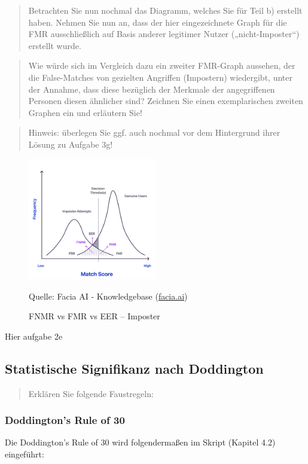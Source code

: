 \documentclass{article}
\newcommand{\annotation}[1]{
    \begin{quote}
    	\begin{textit}
			{#1}
	    \end{textit}
    \end{quote}
}
\newcommand{\figuresource}[1]{
	\begin{center}Quelle: {#1}\end{center}
}
\begin{document}
\annotation{
    Betrachten Sie nun nochmal das Diagramm, welches Sie für Teil b) erstellt haben.
    Nehmen Sie nun an, dass der hier eingezeichnete Graph für die FMR ausschließlich
    auf Basis anderer legitimer Nutzer („nicht-Imposter“) erstellt wurde.
}

\annotation{
    Wie würde sich im Vergleich dazu ein zweiter FMR-Graph aussehen, der die
    False-Matches von gezielten Angriffen (Impostern) wiedergibt, unter der Annahme,
    dass diese bezüglich der Merkmale der angegriffenen Personen diesen ähnlicher
    sind? Zeichnen Sie einen exemplarischen zweiten Graphen ein und erläutern Sie!
}

\annotation{
    Hinweis: überlegen Sie ggf. auch nochmal vor dem Hintergrund ihrer Lösung zu Aufgabe 3g!
}


\begin{figure}[ht]
	\includegraphics[width=0.5\textwidth]{assets/fnmr-fmr-eer-imposter}
	\centering
	\caption{FNMR vs FMR vs EER – Imposter}
	\figuresource{Facia AI - Knowledgebase
		(\href{https://facia.ai/knowledgebase/knowing-the-equal-error-rate-eer-in-biometrics/}{facia.ai})
	}
\end{figure}

Hier aufgabe 2e

\newpage

\subsection{Statistische Signifikanz nach Doddington}

\annotation{Erklären Sie folgende Faustregeln:}

\subsubsection{Doddington’s Rule of 30}

Die Doddington's Rule of 30 wird folgendermaßen im Skript (Kapitel 4.2) eingeführt:\\[0.1em]
\end{document}
